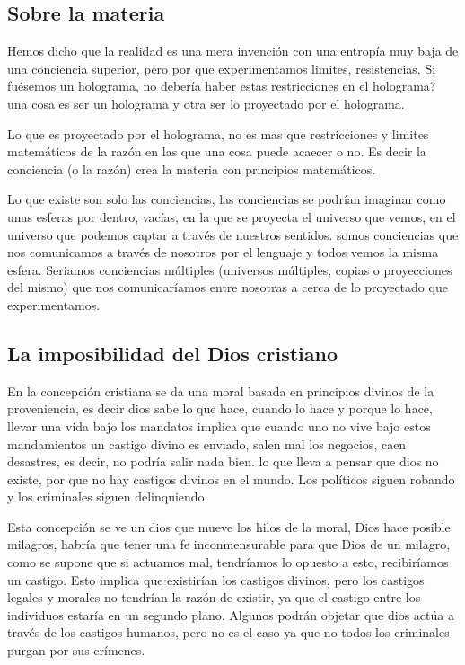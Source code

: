 \documentclass[12pt,letterpaper, a4paper ]{article}
\begin{document}
\subsection{Sobre la materia}
Hemos dicho que la realidad es una mera invención con una entropía muy baja de una conciencia superior, pero por que experimentamos limites, resistencias. Si fuésemos un holograma, no debería haber estas restricciones en el holograma? una cosa es ser un holograma y otra ser lo proyectado por el holograma.

Lo que es proyectado por el holograma, no es mas que restricciones y limites matemáticos de la razón en las que una cosa puede acaecer o no. Es decir la conciencia (o la razón) crea la materia con principios matemáticos.


Lo que existe son solo las conciencias, las conciencias se podrían imaginar como unas esferas por dentro, vacías, en la que se proyecta el universo que vemos, en el universo que podemos captar a través de nuestros sentidos. somos conciencias que nos comunicamos a través de nosotros por el lenguaje y todos vemos la misma esfera. Seriamos conciencias múltiples (universos múltiples, copias o proyecciones del mismo) que nos comunicaríamos entre nosotras a cerca de lo proyectado que experimentamos.


\subsection{La imposibilidad del Dios cristiano}

En la concepción cristiana se da una moral basada en principios divinos de la proveniencia, es decir dios sabe lo que hace, cuando lo hace y porque lo hace, llevar una vida bajo los mandatos implica que cuando uno no vive bajo estos mandamientos un castigo divino es enviado, salen mal los negocios, caen desastres, es decir, no podría salir nada bien. lo que lleva a pensar que dios no existe, por que no hay castigos divinos en el mundo. Los políticos siguen robando y los criminales siguen delinquiendo.

Esta concepción se ve un dios que mueve los hilos de la moral, Dios hace posible milagros, habría que tener una fe inconmensurable para que Dios de un milagro, como se supone que si actuamos mal, tendríamos lo opuesto a esto, recibiríamos un castigo. Esto implica que existirían los castigos divinos, pero los castigos legales y morales no tendrían la razón de existir, ya que el castigo entre los individuos estaría en un segundo plano. Algunos podrán objetar que dios actúa a través de los castigos humanos, pero no es el caso ya que no todos los criminales purgan por sus crímenes.
\end{document}
